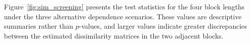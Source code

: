 \documentclass[APA,STIX1COL]{WileyNJD-v2}
\begin{document}
Figure~\ref{fig:sim_screening} presents the test statistics for the four block lengths under the three alternative dependence scenarios.
These values are descriptive summaries rather than  $p$-values, and larger values indicate greater discrepancies between the estimated dissimilarity matrices in the two adjacent blocks.
\end{document}
